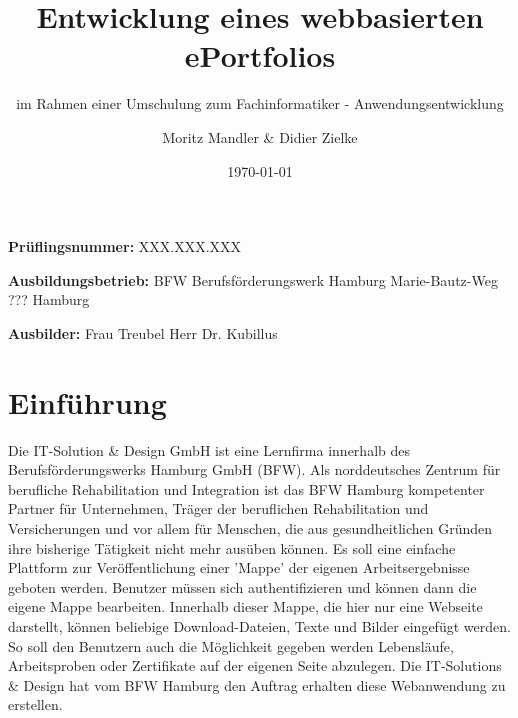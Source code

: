 \documentclass[10.5pt]{scrarticle}
\title{Entwicklung eines webbasierten ePortfolios}
\subtitle{im Rahmen einer Umschulung zum Fachinformatiker - Anwendungsentwicklung}
\author{Moritz Mandler \& Didier Zielke}
\date{\today}
\begin{document}
\lstset{
frameround=fttt,
numbers=left,
breaklines=true,
xleftmargin=0.75cm,
basicstyle=\ttfamily,
numberstyle=\ttfamily,
extendedchars=true,
inputencoding=utf8
}

\maketitle


\vspace{\fill}
\textbf{Prüflingsnummer:} \newline
XXX.XXX.XXX

\textbf{Ausbildungsbetrieb:}\newline
BFW Berufsförderungswerk Hamburg \newline
Marie-Bautz-Weg ???  Hamburg

\textbf{Ausbilder:}\newline
Frau Treubel \newline
Herr Dr. Kubillus

\newpage

\tableofcontents

\newpage

\section{Einführung}

Die IT-Solution \& Design GmbH ist eine Lernfirma innerhalb des Berufsförderungswerks Hamburg GmbH (BFW). Als norddeutsches Zentrum für berufliche Rehabilitation und Integration ist das BFW Hamburg kompetenter Partner für Unternehmen, Träger der beruflichen Rehabilitation und Versicherungen und vor allem für Menschen, die aus gesundheitlichen Gründen ihre bisherige Tätigkeit nicht mehr ausüben können.  
Es soll eine einfache Plattform zur Veröffentlichung einer 'Mappe' der eigenen Arbeitsergebnisse geboten werden. Benutzer müssen sich authentifizieren und können dann die eigene Mappe bearbeiten. Innerhalb dieser Mappe, die hier nur eine Webseite darstellt, können beliebige Download-Dateien, Texte und Bilder eingefügt werden. So soll den Benutzern auch die Möglichkeit gegeben werden Lebensläufe, Arbeitsproben oder Zertifikate auf der eigenen Seite abzulegen.
Die IT-Solutions \& Design hat vom BFW Hamburg den Auftrag erhalten diese Webanwendung zu erstellen. 
\end{document}
